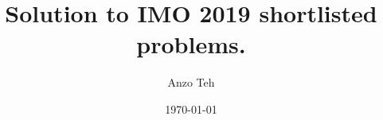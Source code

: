 \documentclass[11pt,a4paper]{article}
\begin{document}
\newcommand{\la}{\leftarrow}
\newcommand{\lra}{\leftrightarrow}
\newcommand{\bbN}{{\mathbb N}}
\newcommand{\bbZ}{{\mathbb Z}}
\newcommand{\bbQ}{{\mathbb Q}}
\newcommand{\bbR}{{\mathbb R}}
\newcommand{\bbC}{{\mathbb C}}
\newcommand{\bbH}{{\mathbb H}}
\newcommand{\dfeq}{\stackrel{\mathrm{def}}{=}}
\newcommand{\ra}{\rightarrow}
\newcommand{\Span}{\mathrm{span}}
\newcommand{\scrP}{\mathscr{P}}
\newcommand{\rank}{\mathrm{rank}}
\newcommand{\nullity}{\mathrm{nullity}}
\newcommand{\Col}{\mathrm{Col}}
\newcommand{\Row}{\mathrm{Row}}
\newcommand{\tr}{\mathrm{tr}}
\newcommand{\ol}{\overline}
\newcommand{\norm}[1]{||#1||}
\newcommand{\doubleline}[1]{\underline{\underline{#1}}}
\newcommand{\elemop}[1]{\stackrel{#1}{\longrightarrow}}
\newcommand{\Ind}{\mathrm{Ind}}
\newcommand{\Res}{\mathrm{Res}}
\newcommand{\End}{\mathrm{End}}
\newcommand{\cl}{\mathrm{cl}}
\newcommand{\code}[1]{\texttt{#1}}
\newcommand\tab[1][0.5cm]{\hspace*{#1}}
\newcommand{\<}{\langle}
\renewcommand{\>}{\rangle}
\newcommand{\qubits}[1]{|{#1}\rangle}
\newcommand{\powset}{\mathcal{P}}
\newcommand{\dsum}{\displaystyle\sum}
\newcommand{\dprod}{\displaystyle\prod}

\title{Solution to IMO 2019 shortlisted problems.}
\author{Anzo Teh}
\date{\today}
\maketitle

\newpage
\end{document}
